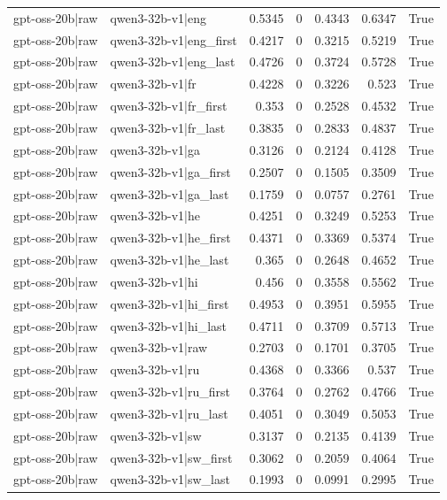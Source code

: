 \begin{table}
\begin{tabular}{l l r r r r l}
gpt-oss-20b|raw & qwen3-32b-v1|eng & 0.5345 & 0 & 0.4343 & 0.6347 & True \\
gpt-oss-20b|raw & qwen3-32b-v1|eng_first & 0.4217 & 0 & 0.3215 & 0.5219 & True \\
gpt-oss-20b|raw & qwen3-32b-v1|eng_last & 0.4726 & 0 & 0.3724 & 0.5728 & True \\
gpt-oss-20b|raw & qwen3-32b-v1|fr & 0.4228 & 0 & 0.3226 & 0.523 & True \\
gpt-oss-20b|raw & qwen3-32b-v1|fr_first & 0.353 & 0 & 0.2528 & 0.4532 & True \\
gpt-oss-20b|raw & qwen3-32b-v1|fr_last & 0.3835 & 0 & 0.2833 & 0.4837 & True \\
gpt-oss-20b|raw & qwen3-32b-v1|ga & 0.3126 & 0 & 0.2124 & 0.4128 & True \\
gpt-oss-20b|raw & qwen3-32b-v1|ga_first & 0.2507 & 0 & 0.1505 & 0.3509 & True \\
gpt-oss-20b|raw & qwen3-32b-v1|ga_last & 0.1759 & 0 & 0.0757 & 0.2761 & True \\
gpt-oss-20b|raw & qwen3-32b-v1|he & 0.4251 & 0 & 0.3249 & 0.5253 & True \\
gpt-oss-20b|raw & qwen3-32b-v1|he_first & 0.4371 & 0 & 0.3369 & 0.5374 & True \\
gpt-oss-20b|raw & qwen3-32b-v1|he_last & 0.365 & 0 & 0.2648 & 0.4652 & True \\
gpt-oss-20b|raw & qwen3-32b-v1|hi & 0.456 & 0 & 0.3558 & 0.5562 & True \\
gpt-oss-20b|raw & qwen3-32b-v1|hi_first & 0.4953 & 0 & 0.3951 & 0.5955 & True \\
gpt-oss-20b|raw & qwen3-32b-v1|hi_last & 0.4711 & 0 & 0.3709 & 0.5713 & True \\
gpt-oss-20b|raw & qwen3-32b-v1|raw & 0.2703 & 0 & 0.1701 & 0.3705 & True \\
gpt-oss-20b|raw & qwen3-32b-v1|ru & 0.4368 & 0 & 0.3366 & 0.537 & True \\
gpt-oss-20b|raw & qwen3-32b-v1|ru_first & 0.3764 & 0 & 0.2762 & 0.4766 & True \\
gpt-oss-20b|raw & qwen3-32b-v1|ru_last & 0.4051 & 0 & 0.3049 & 0.5053 & True \\
gpt-oss-20b|raw & qwen3-32b-v1|sw & 0.3137 & 0 & 0.2135 & 0.4139 & True \\
gpt-oss-20b|raw & qwen3-32b-v1|sw_first & 0.3062 & 0 & 0.2059 & 0.4064 & True \\
gpt-oss-20b|raw & qwen3-32b-v1|sw_last & 0.1993 & 0 & 0.0991 & 0.2995 & True \\

\end{tabular}
\end{table}
